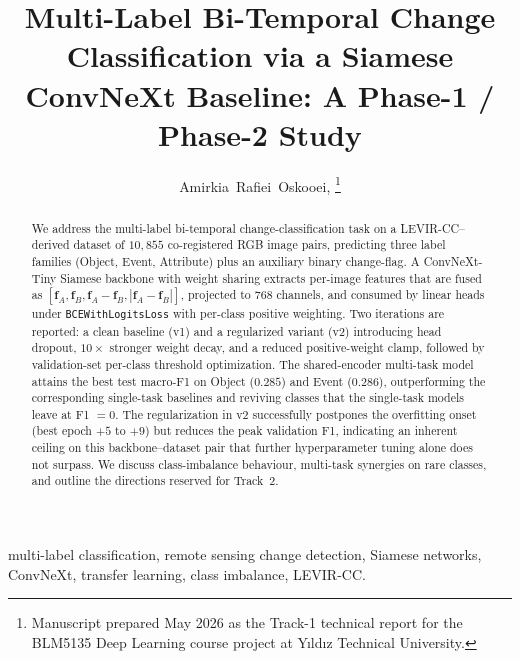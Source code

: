 \documentclass[journal]{IEEEtran}
\begin{document}
\title{Multi-Label Bi-Temporal Change Classification via a Siamese ConvNeXt Baseline: A Phase-1 / Phase-2 Study}

\author{
  Amirkia~Rafiei~Oskooei,
  \thanks{Manuscript prepared May 2026 as the Track-1 technical report for the BLM5135 Deep Learning course project at Y\i ld\i z Technical University.}
}


\maketitle

\begin{abstract}
We address the multi-label bi-temporal change-classification task on a LEVIR-CC--derived dataset of $10{,}855$ co-registered RGB image pairs, predicting three label families (Object, Event, Attribute) plus an auxiliary binary change-flag. A ConvNeXt-Tiny Siamese backbone with weight sharing extracts per-image features that are fused as $[\mathbf{f}_A, \mathbf{f}_B, \mathbf{f}_A{-}\mathbf{f}_B, |\mathbf{f}_A{-}\mathbf{f}_B|]$, projected to $768$ channels, and consumed by linear heads under \texttt{BCEWithLogitsLoss} with per-class positive weighting. Two iterations are reported: a clean baseline (v1) and a regularized variant (v2) introducing head dropout, $10\!\times$ stronger weight decay, and a reduced positive-weight clamp, followed by validation-set per-class threshold optimization. The shared-encoder multi-task model attains the best test macro-F1 on Object ($0.285$) and Event ($0.286$), outperforming the corresponding single-task baselines and reviving classes that the single-task models leave at F1 $=0$. The regularization in v2 successfully postpones the overfitting onset (best epoch $+5$ to $+9$) but reduces the peak validation F1, indicating an inherent ceiling on this backbone--dataset pair that further hyperparameter tuning alone does not surpass. We discuss class-imbalance behaviour, multi-task synergies on rare classes, and outline the directions reserved for Track~2.
\end{abstract}

\begin{IEEEkeywords}
multi-label classification, remote sensing change detection, Siamese networks, ConvNeXt, transfer learning, class imbalance, LEVIR-CC.
\end{IEEEkeywords}
\end{document}
